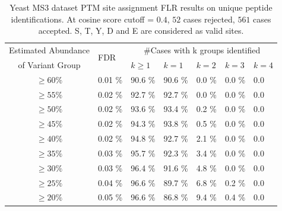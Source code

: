 \begin{table}[h]
  \centering
  \caption{Yeast MS3 dataset PTM site assignment FLR results on unique peptide identifications. At cosine score cutoff = $0.4$, $52$ cases rejected, $561$ cases accepted. S, T, Y, D and E are considered as valid sites.}\label{tbl:YeastFLR_uniq_STYDE}
\begin{tabular}{|c|l|l|l|l|l|l|}
\hline
Estimated Abundance & \multirow{2}{*}{FDR} & \multicolumn{5}{|c|}{\#Cases with k groups identified }\\
of Variant Group & & $k\ge 1$ & $k=1$ & $k=2$ & $k=3$  & $k=4$\\
\hline
$\ge	60	\%$ &	0.01	\% &	90.6	\% &	90.6	\% &	0.0	\% &	0.0	\% &	0.0	\\
$\ge	55	\%$ &	0.02	\% &	92.7	\% &	92.7	\% &	0.0	\% &	0.0	\% &	0.0	\\
$\ge	50	\%$ &	0.02	\% &	93.6	\% &	93.4	\% &	0.2	\% &	0.0	\% &	0.0	\\
$\ge	45	\%$ &	0.02	\% &	94.3	\% &	93.8	\% &	0.5	\% &	0.0	\% &	0.0	\\
$\ge	40	\%$ &	0.02	\% &	94.8	\% &	92.7	\% &	2.1	\% &	0.0	\% &	0.0	\\
$\ge	35	\%$ &	0.03	\% &	95.7	\% &	92.3	\% &	3.4	\% &	0.0	\% &	0.0	\\
$\ge	30	\%$ &	0.03	\% &	96.4	\% &	91.6	\% &	4.8	\% &	0.0	\% &	0.0	\\
$\ge	25	\%$ &	0.04	\% &	96.6	\% &	89.7	\% &	6.8	\% &	0.2	\% &	0.0	\\
$\ge	20	\%$ &	0.05	\% &	96.6	\% &	86.8	\% &	9.4	\% &	0.4	\% &	0.0	\\
\hline
\end{tabular}
\end{table}

